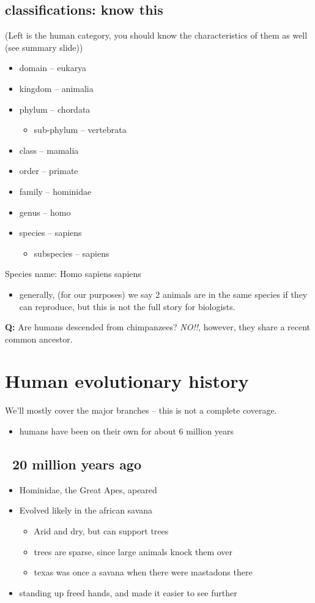 \documentclass{article}
\theoremstyle{definition}
\begin{document}
\subsection{classifications: know this}
(Left is the human category, you should know the characteristics of them as well (see summary slide))
\begin{itemize}
	\item domain -- eukarya
	\item kingdom -- animalia
	\item phylum -- chordata
		\begin{itemize}
			\item sub-phylum -- vertebrata
		\end{itemize}
	\item class -- mamalia
	\item order -- primate
	\item family -- hominidae
	\item genus -- homo
	\item species -- sapiens
		\begin{itemize}
			\item subspecies -- sapiens
		\end{itemize}
\end{itemize}
Species name: Homo sapiens sapiens
\begin{itemize}
	\item generally, (for our purposes) we say 2 animals are in the same species if they can reproduce, but this is not the full story for biologists.
\end{itemize}

\textbf{Q:} Are humans descended from chimpanzees? \textit{NO!!}, however, they share a recent common ancestor.

\section{Human evolutionary history}
We'll mostly cover the major branches -- this is not a complete coverage.
\begin{itemize}
	\item humans have been on their own for about 6 million years
\end{itemize}
\subsection{~20 million years ago}

\begin{itemize}
	\item Hominidae, the Great Apes, apeared
	\item Evolved likely in the african savana
		\begin{itemize}
			\item Arid and dry, but can support trees
			\item trees are sparse, since large animals knock them over
			\item texas was once a savana when there were mastadons there
		\end{itemize}
	\item standing up freed hands, and made it easier to see further
\end{itemize}
\end{document}
